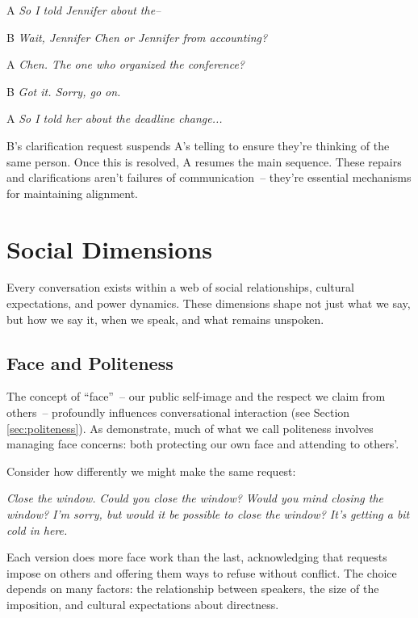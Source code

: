 \ea
\begin{dialogue}
\item[A] \textit{So I told Jennifer about the-- }
\item[B] \textit{Wait, Jennifer Chen or Jennifer from accounting?}
\item[A] \textit{Chen. The one who organized the conference?}
\item[B] \textit{Got it. Sorry, go on.}
\item[A] \textit{So I told her about the deadline change...}
\end{dialogue}
\z
B's clarification request suspends A's telling to ensure they're thinking of the same person. Once this is resolved, A resumes the main sequence. These repairs and clarifications aren't failures of communication~-- they're essential mechanisms for maintaining alignment.

\section{Social Dimensions} \label{sec:social}

Every conversation exists within a web of social relationships, cultural expectations, and power dynamics. These dimensions shape not just what we say, but how we say it, when we speak, and what remains unspoken.

\subsection{Face and Politeness} \label{subsec:face}

The concept of ``face''~-- our public self-image and the respect we claim from others~-- profoundly influences conversational interaction (see Section \ref{sec:politeness}). As \citet{brown1987} demonstrate, much of what we call politeness involves managing face concerns: both protecting our own face and attending to others'.

Consider how differently we might make the same request:

\ea
\ea \textit{Close the window.}
\ex \textit{Could you close the window?}
\ex \textit{Would you mind closing the window?}
\ex \textit{I'm sorry, but would it be possible to close the window? It's getting a bit cold in here.}
\z\z

Each version does more face work than the last, acknowledging that requests impose on others and offering them ways to refuse without conflict. The choice depends on many factors: the relationship between speakers, the size of the imposition, and cultural expectations about directness.

